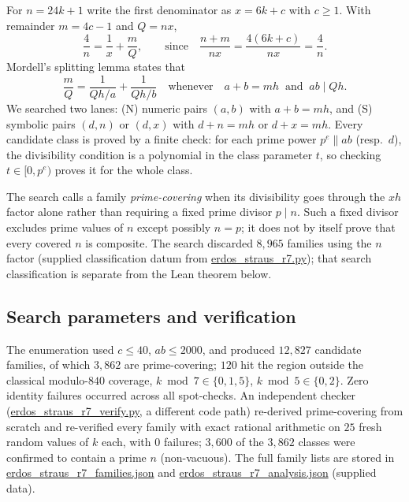 \documentclass[11pt,a4paper]{article}
\theoremstyle{definition}
\begin{document}
For $n = 24k+1$ write the first denominator as $x = 6k+c$ with $c \geq 1$.
With remainder $m = 4c-1$ and $Q = nx$,
\begin{equation}
  \label{eq:firststep}
  \frac{4}{n} = \frac{1}{x} + \frac{m}{Q},
  \qquad\text{since}\quad
  \frac{n+m}{nx} = \frac{4(6k+c)}{nx} = \frac{4}{n}.
\end{equation}
Mordell's splitting lemma states that
\begin{equation}
  \label{eq:splitting}
  \frac{m}{Q} = \frac{1}{Qh/a} + \frac{1}{Qh/b}
  \quad\text{whenever}\quad a+b = mh \ \text{ and }\ ab \mid Qh.
\end{equation}
We searched two lanes: (N) numeric pairs $(a,b)$ with $a+b=mh$, and (S)
symbolic pairs $(d,n)$ or $(d,x)$ with $d+n=mh$ or $d+x=mh$. Every candidate
class is proved by a finite check: for each prime power $p^e \parallel ab$
(resp.\ $d$), the divisibility condition is a polynomial in the class
parameter $t$, so checking $t \in [0, p^e)$ proves it for the whole class.

The search calls a family \emph{prime-covering} when its divisibility goes
through the $xh$ factor alone rather than requiring a fixed prime divisor
$p\mid n$. Such a fixed divisor excludes prime values of $n$ except
possibly $n=p$; it does not by itself prove that every covered $n$ is
composite. The search discarded $8{,}965$ families using the $n$ factor
(supplied classification datum from \url{erdos_straus_r7.py}); that search
classification is separate from the Lean theorem below.

\subsection{Search parameters and verification}

The enumeration used $c \leq 40$, $ab \leq 2000$, and produced $12{,}827$
candidate families, of which $3{,}862$ are prime-covering; $120$ hit the
region outside the classical modulo-$840$ coverage,
$k \bmod 7 \in \{0,1,5\}$, $k \bmod 5 \in \{0,2\}$.
Zero identity failures occurred across all spot-checks. An independent
checker (\url{erdos_straus_r7_verify.py}, a different code path)
re-derived prime-covering from scratch and re-verified every family with
exact rational arithmetic on $25$ fresh random values of $k$ each, with
$0$ failures; $3{,}600$ of the $3{,}862$ classes were confirmed to contain
a prime $n$ (non-vacuous). The full family lists are stored in
\url{erdos_straus_r7_families.json} and
\url{erdos_straus_r7_analysis.json} (supplied data).
\end{document}
